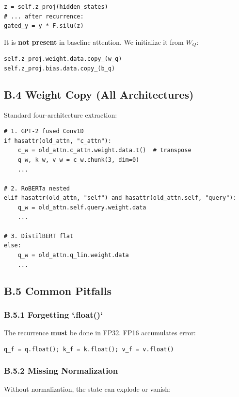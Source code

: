 \begin{lstlisting}
z = self.z_proj(hidden_states)
# ... after recurrence:
gated_y = y * F.silu(z)
\end{lstlisting}

It is \textbf{not present} in baseline attention. We initialize it from $W_Q$:

\begin{lstlisting}
self.z_proj.weight.data.copy_(w_q)
self.z_proj.bias.data.copy_(b_q)
\end{lstlisting}

\subsection{B.4 Weight Copy (All Architectures)}

Standard four-architecture extraction:

\begin{lstlisting}
# 1. GPT-2 fused Conv1D
if hasattr(old_attn, "c_attn"):
    c_w = old_attn.c_attn.weight.data.t()  # transpose
    q_w, k_w, v_w = c_w.chunk(3, dim=0)
    ...

# 2. RoBERTa nested
elif hasattr(old_attn, "self") and hasattr(old_attn.self, "query"):
    q_w = old_attn.self.query.weight.data
    ...

# 3. DistilBERT flat
else:
    q_w = old_attn.q_lin.weight.data
    ...
\end{lstlisting}

\subsection{B.5 Common Pitfalls}

\subsubsection{B.5.1 Forgetting `.float()`}

The recurrence \textbf{must} be done in FP32. FP16 accumulates error:

\begin{lstlisting}
q_f = q.float(); k_f = k.float(); v_f = v.float()
\end{lstlisting}

\subsubsection{B.5.2 Missing Normalization}

Without normalization, the state can explode or vanish:

